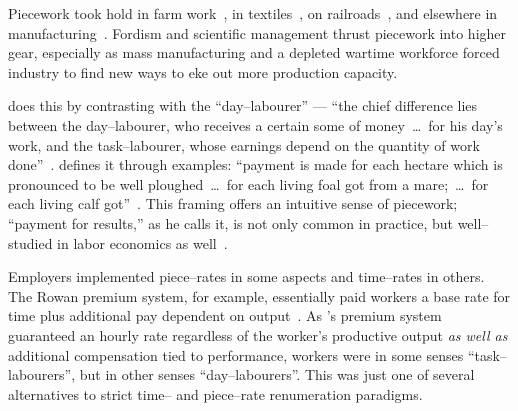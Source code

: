 \documentclass[trackingWork]{subfiles}
\begin{document}
Piecework took hold in farm work~\cite{hughRaynbirdTaskWork},
in textiles~\cite{restructuringPieceworkBaker,riisOtherSideLives},
on railroads~\cite{Brown01041990}, and 
elsewhere in manufacturing~\cite{10.2307/3827491}.
Fordism and scientific management thrust piecework into higher gear, especially as
mass manufacturing and
a depleted wartime workforce forced industry to find new ways to eke out more production capacity.


\citeauthor{hughRaynbirdTaskWork} does this by contrasting with the ``day--labourer'' ---
``the chief difference lies between the day--labourer,
who receives a certain some of money~\dots~for his day's work,
and the task--labourer, whose earnings depend on the quantity of work done''~\cite{hughRaynbirdTaskWork}.
\citeauthor{10.2307/2338394} defines it through examples:
``payment is made for each hectare which is pronounced to be well ploughed~\dots~for each living foal got from a mare;~\dots~for each living calf got''~\cite{10.2307/2338394}.
This framing offers an intuitive sense of piecework;
``payment for results,'' as he calls it,
is not only common in practice, but
well--studied in labor economics as well~\cite{Figlio2007901,weitzman1976new,10.2307/3003414,BJIR:BJIR038}.

Employers implemented piece--rates in some aspects and
time--rates in others.
The Rowan premium system, for example,
essentially paid workers
a base rate for time plus
additional pay dependent on output~\cite{rowan1901premium}.
As \citeauthor{rowan1901premium}'s premium system guaranteed an hourly rate
regardless of the worker's productive output
\textit{as well as} additional compensation tied to performance,
workers were
in some senses ``task--labourers'', but
in other senses ``day--labourers''.
This was just one of several alternatives to strict time-- and piece--rate renumeration paradigms.
\end{document}
